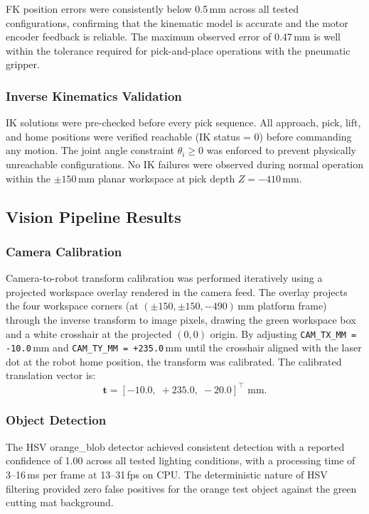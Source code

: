 \hspace{1.27cm}
FK position errors were consistently below 0.5\,mm across all tested configurations, confirming that the kinematic model is accurate and the motor encoder feedback is reliable. The maximum observed error of 0.47\,mm is well within the tolerance required for pick-and-place operations with the pneumatic gripper.

\subsubsection{Inverse Kinematics Validation}
\hspace{1.27cm}
IK solutions were pre-checked before every pick sequence. All approach, pick, lift, and home positions were verified reachable (IK status = 0) before commanding any motion. The joint angle constraint $\theta_i \geq 0$ was enforced to prevent physically unreachable configurations. No IK failures were observed during normal operation within the $\pm150$\,mm planar workspace at pick depth $Z = -410$\,mm.

\subsection{Vision Pipeline Results}

\subsubsection{Camera Calibration}
\hspace{1.27cm}
Camera-to-robot transform calibration was performed iteratively using a projected workspace overlay rendered in the camera feed. The overlay projects the four workspace corners (at $(\pm150, \pm150, -490)$\,mm platform frame) through the inverse transform to image pixels, drawing the green workspace box and a white crosshair at the projected $(0, 0)$ origin. By adjusting \texttt{CAM\_TX\_MM = -10.0}\,mm and \texttt{CAM\_TY\_MM = +235.0}\,mm until the crosshair aligned with the laser dot at the robot home position, the transform was calibrated. The calibrated translation vector is:
\begin{equation*}
    \mathbf{t} = [-10.0,\; +235.0,\; -20.0]^\top \text{ mm}.
\end{equation*}

\subsubsection{Object Detection}
\hspace{1.27cm}
The HSV orange\_blob detector achieved consistent detection 
with a reported confidence of 1.00 across all tested 
lighting conditions, with a processing time of 3--16\,ms 
per frame at 13--31\,fps on CPU. The deterministic nature 
of HSV filtering provided zero false positives for the 
orange test object against the green cutting mat background.


